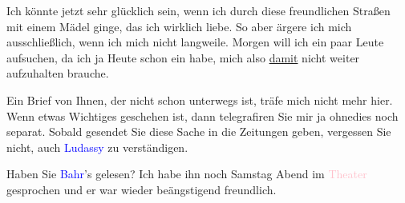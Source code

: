 \pstart
           {\pb}Ich könnte jetzt sehr
               glücklich sein, wenn ich durch diese freundlichen Straßen mit einem Mädel ginge, das
               ich wirklich liebe. So aber ärgere ich mich ausschließlich, wenn ich mich nicht
               langweile. Morgen will ich ein paar Leute aufsuchen,
               da ich ja Heute schon ein \label{K_L03152-2v}\label{K_L03152-2h} habe, mich
               also \uline{damit} nicht weiter aufzuhalten brauche.\pend
           
\pstart
           Ein Brief von Ihnen, der nicht schon unterwegs ist, träfe mich nicht mehr hier. Wenn
               etwas Wichtiges geschehen ist, dann telegrafiren Sie mir ja ohnedies noch separat.
               Sobald \label{K_L03152-3v}\label{K_L03152-3h} gesendet {\kaufmannsund} Sie
               diese Sache in die Zeitungen geben, vergessen Sie nicht, auch {\pb}\textcolor{blue}{Ludassy}{}\ledrightnote{\textcolor{blue}{Julius von Gans-Ludassy}} zu verständigen.\pend
           
\pstart
           Haben Sie \textcolor{blue}{Bahr}{}\ledrightnote{\textcolor{blue}{Hermann Bahr}}’s \label{K_L03152-4v}\label{K_L03152-4h} gelesen? Ich habe ihn noch Samstag{ }Abend im \textcolor{pink}{Theater}{}\ledrightnote{{$\rightarrow$}\textcolor{pink}{Volkstheater}} gesprochen und er war wieder beängstigend freundlich.\pend
           
